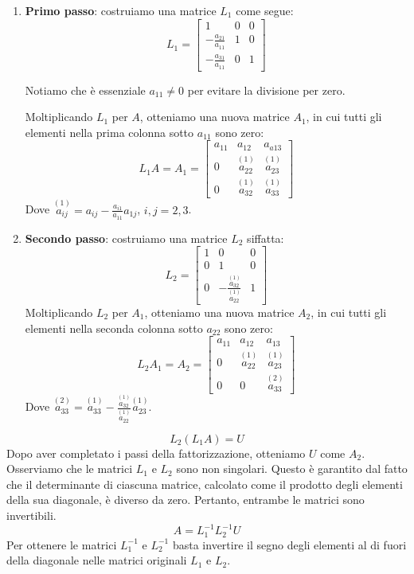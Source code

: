 \documentclass{article}
\begin{document}
\begin{enumerate}
    \item \textbf{Primo passo}: costruiamo una matrice $L_1$ come segue: 
    $$L_1=\begin{bmatrix}
        1 & 0 & 0 \\ 
        -\frac{a_{21}}{a_{11}} & 1 & 0 \\ 
        -\frac{a_{31}}{a_{11}} & 0 & 1
    \end{bmatrix}$$

    Notiamo che è essenziale $a_{11}\neq0$ per evitare la divisione per zero.

    Moltiplicando $L_1$ per $A$, otteniamo una nuova matrice $A_1$, in cui
    tutti gli elementi nella prima colonna sotto $a_{11}$ sono zero:
    $$L_1A=A_1=\begin{bmatrix}
        a_{11} & a_{12} & a_{a13} \\ 
        0 & \overset{(1)}{a_{22}} & \overset{(1)}{a_{23}} \\ 
        0 & \overset{(1)}{a_{32}} & \overset{(1)}{a_{33}}
    \end{bmatrix}$$
    Dove $\overset{(1)}{a_{ij}}=a_{ij}-\frac{a_{i1}}{a_{11}}a_{1j}$, $i,j=2,3$.
    \item\textbf{Secondo passo}: costruiamo una matrice $L_2$ siffatta:
    $$L_2=\begin{bmatrix}
        1 & 0 & 0 \\ 
        0 & 1 & 0 \\ 
        0 & -\frac{\overset{(1)}{a_{32}}}{\overset{(1)}{a_{22}}} & 1
    \end{bmatrix}$$
    Moltiplicando $L_2$ per $A_1$, otteniamo una nuova matrice $A_2$, in cui
    tutti gli elementi nella seconda colonna sotto $a_{22}$ sono zero:
    $$L_2A_1=A_2=\begin{bmatrix}
        a_{11} & a_{12} & a_{13} \\ 
        0 & \overset{(1)}{a_{22}} & \overset{(1)}{a_{23}} \\ 
        0 & 0 & \overset{(2)}{a_{33}}
    \end{bmatrix}$$
    Dove $\overset{(2)}{a_{33}}=\overset{(1)}{a_{33}}-\frac{\overset{(1)}{a_{32}}}{\overset{(1)}{a_{22}}}\overset{(1)}{a_{23}}$.
\end{enumerate}

$$L_{2}(L_{1}A)=U$$
Dopo aver completato i passi della fattorizzazione, otteniamo $U$ come $A_2$.
Osserviamo che le matrici $L_1$ e $L_2$ sono non singolari. Questo è garantito
dal fatto che il determinante di ciascuna matrice,  calcolato come il prodotto
degli elementi della sua diagonale, è diverso da zero. Pertanto, entrambe  le
matrici sono invertibili.
$$A=L_{1}^{-1}L_{2}^{-1}U$$
Per ottenere le matrici $L_{1}^{-1}$ e $L_{2}^{-1}$ basta invertire il segno
degli elementi al di fuori della diagonale nelle matrici originali $L_1$ e
$L_2$.
\end{document}
